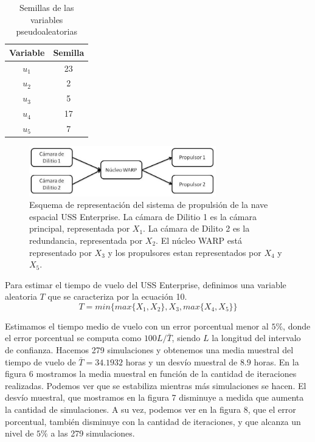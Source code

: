 \documentclass[10pt,journal,compsoc]{IEEEtran}
\begin{document}
\begin{table}[!t]
\renewcommand{\arraystretch}{1.3}
\caption{Semillas de las variables pseudoaleatorias}
\centering
\begin{tabular}{c c}
\hline
\hline
Variable  & Semilla\\
\hline
$u_1$ &  23\\
$u_2$ & 2 \\
$u_3$ & 5 \\
$u_4$ & 17  \\
$u_5$ & 7 \\
\hline
\hline
\end{tabular}
\label{tab:sim}
\end{table}

\begin{figure}[t]
\label{fig:3d}
\begin{center}
\centering
\includegraphics[width=3.2in]{propulsor.jpg}
\caption{Esquema de representaci\'on del sistema de propulsi\'on de la nave espacial USS Enterprise.  La c\'amara de Dilitio 1 es la c\'amara principal, representada por $X_1$. La c\'amara de Dilito 2 es la redundancia, representada por $X_2$. El n\'ucleo WARP est\'a representado
 por $X_3$ y los propulsores estan representados por $X_4$ y $X_5$.}
\end{center}
\end{figure}

Para estimar el tiempo de vuelo del USS Enterprise, definimos una variable aleatoria $T$ que se caracteriza por la ecuaci\'on 10.
\begin{equation}
T = min\{ max\{X_1, X_2\}, X_3, max\{X_4, X_5\} \}
\end{equation}

\indent Estimamos el tiempo medio de vuelo con un error porcentual menor al $5\%$, donde el error porcentual se computa
como $100L/\bar{T}$, siendo $L$ la longitud del intervalo de confianza.  Hacemos 279 simulaciones y obtenemos una
media muestral del tiempo de vuelo de $\bar{T}=34.1932$ horas y un desv\'io muestral de $8.9$ horas.
En la figura 6 mostramos la media muestral en funci\'on de la cantidad de iteraciones realizadas.  Podemos ver que se 
estabiliza mientras m\'as simulaciones se hacen. El desv\'io muestral, que
mostramos en la figura 7 disminuye a medida que aumenta la cantidad de simulaciones.  A su vez, podemos ver en la figura 8,
que el error porcentual, tambi\'en disminuye con la cantidad de iteraciones, y que alcanza un nivel de $5\%$ a las 279 simulaciones.
\end{document}
